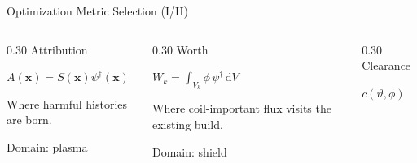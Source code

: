 \documentclass[aspectratio=169,10pt]{beamer}
\newcommand{\slideline}{\par\vspace{0.12cm}{\color{jqdark}\rule{\linewidth}{0.65pt}}\par}
\begin{document}
\begin{frame}[t]{Optimization Metric Selection (I/II)}
  \centering
  \vspace{0.04cm}
  \begin{columns}[T,totalwidth=0.94\textwidth]
    \begin{column}{0.30\textwidth}
      Attribution
      \slideline
      \begin{minipage}[t][1.10cm][t]{\linewidth}
        \vspace{0.26cm}
        \centering
        $\displaystyle A(\mathbf{x})=S(\mathbf{x})\psi^{\dagger}(\mathbf{x})$
      \end{minipage}
      \begin{minipage}[t][0.95cm][t]{\linewidth}
        \vspace{0.10cm}
        \raggedright
        Where harmful histories are born.
      \end{minipage}
      \begin{minipage}[t][0.70cm][t]{\linewidth}
        \vspace{0.22cm}
        {\fontsize{8.0}{9.4}\selectfont Domain: plasma}
      \end{minipage}
    \end{column}
    \begin{column}{0.30\textwidth}
      Worth
      \slideline
      \begin{minipage}[t][1.10cm][t]{\linewidth}
        \vspace{0.26cm}
        \centering
        $\displaystyle W_k=\int_{V_k}\phi\,\psi^{\dagger}\,\mathrm{d}V$
      \end{minipage}
      \begin{minipage}[t][0.95cm][t]{\linewidth}
        \vspace{0.10cm}
        \raggedright
        Where coil-important flux visits the existing build.
      \end{minipage}
      \begin{minipage}[t][0.70cm][t]{\linewidth}
        \vspace{0.22cm}
        {\fontsize{8.0}{9.4}\selectfont Domain: shield}
      \end{minipage}
    \end{column}
    \begin{column}{0.30\textwidth}
      Clearance
      \slideline
      \begin{minipage}[t][1.10cm][t]{\linewidth}
        \vspace{0.26cm}
        \centering
        $\displaystyle c(\vartheta,\phi)$

\end{minipage}
\end{column}
\end{columns}
\end{frame}
\end{document}

